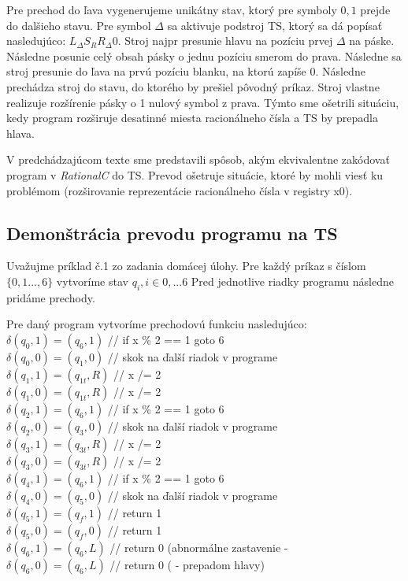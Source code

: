 \documentclass[10pt]{article}
\begin{document}
Pre prechod do ľava vygenerujeme unikátny stav, ktorý pre symboly ${0,1}$ prejde do dalšieho stavu. Pre symbol $\Delta$ sa aktivuje podstroj TS, ktorý sa dá popísať nasledujúco:
$L_\Delta S_R R_\Delta 0$.
Stroj najpr presunie hlavu na pozíciu prvej $\Delta$ na páske. Následne posunie celý obsah pásky o jednu pozíciu smerom do prava. Následne sa stroj presunie do ľava na prvú pozíciu
blanku, na ktorú zapíše 0. Následne prechádza stroj do stavu, do ktorého by prešiel pôvodný príkaz.
Stroj vlastne realizuje rozšírenie pásky o 1 nulový symbol z prava. Týmto sme ošetrili situáciu, kedy program rozširuje desatinné miesta racionálneho čísla a TS by prepadla hlava.

V predchádzajúcom texte sme predstavili spôsob, akým ekvivalentne zakódovať program v \textit{RationalC} do TS. Prevod ošetruje situácie, ktoré by mohli viesť ku problémom (rozširovanie reprezentácie
racionálneho čísla v registry x0).

\subsection*{Demonštrácia prevodu programu na TS}
Uvažujme príklad č.1 zo zadania domácej úlohy. Pre každý príkaz s číslom $\{0,1...,6\}$ vytvoríme stav $q_i, i \in {0,...6}$
Pred jednotlive riadky programu následne pridáme prechody.

Pre daný program vytvoríme prechodovú funkciu nasledujúco: \\
    $\delta(q_0, 1) = (q_6, 1)$ // if x \% 2 == 1 goto 6  \\
    $\delta(q_0, 0) = (q_1, 0)$ // skok na ďalší riadok v programe\\
    $\delta(q_1, 1) = (q_{1t}, R)$ //  x /= 2 \\
    $\delta(q_1, 0) = (q_{1t}, R)$ //  x /= 2\\
    $\delta(q_2, 1) = (q_6, 1)$ // if x \% 2 == 1 goto 6\\
    $\delta(q_2, 0) = (q_3, 0)$ // skok na ďalší riadok v programe\\
    $\delta(q_3, 1) = (q_{3t}, R)$ //  x /= 2 \\
    $\delta(q_3, 0) = (q_{3t}, R)$ //  x /= 2\\
    $\delta(q_4, 1) = (q_6, 1)$ // if x \% 2 == 1 goto 6\\
    $\delta(q_4, 0) = (q_5, 0)$ // skok na ďalší riadok v programe\\
    $\delta(q_5, 1) = (q_f, 1)$ // return 1\\
    $\delta(q_5, 0) = (q_f, 0)$ // return 1\\
    $\delta(q_6, 1) = (q_6, L)$ // return 0 (abnormálne zastavenie -\\
    $\delta(q_6, 0) = (q_6, L)$ // return 0 ( - prepadom hlavy)\\
\end{document}
